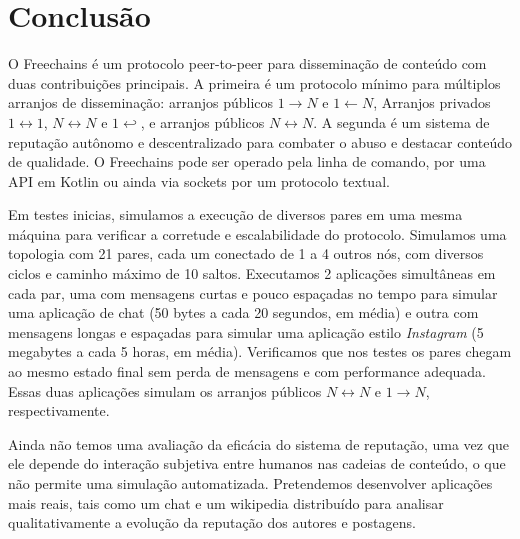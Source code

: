 \documentclass[12pt]{article}
\newcommand{\FC} {Freechains\xspace}
\newcommand{\Xon} {$1{\rightarrow}N$\xspace}
\newcommand{\Xno} {$1{\leftarrow}N$\xspace}
\newcommand{\Xnn} {$N{\leftrightarrow}N$\xspace}
\newcommand{\Xoo} {$1{\leftrightarrow}1$\xspace}
\newcommand{\Xo}  {$1{\hookleftarrow}$\xspace}
\begin{document}
\section{Conclusão}
\label{sec.conclusion}

O \FC é um protocolo peer-to-peer para disseminação de conteúdo com duas
contribuições principais.
A primeira é um protocolo mínimo para múltiplos arranjos de disseminação:
arranjos públicos \Xon e \Xno, Arranjos privados \Xoo, \Xnn e \Xo, e arranjos
públicos \Xnn.
A segunda é um sistema de reputação autônomo e descentralizado para combater
o abuso e destacar conteúdo de qualidade.
O \FC pode ser operado pela linha de comando, por uma API em Kotlin ou ainda
via sockets por um protocolo textual.

Em testes inicias, simulamos a execução de diversos pares em uma mesma máquina
para verificar a corretude e escalabilidade do protocolo.
Simulamos uma topologia com 21 pares, cada um conectado de 1 a 4 outros nós,
com diversos ciclos e caminho máximo de 10 saltos.
Executamos 2 aplicações simultâneas em cada par, uma com mensagens curtas e
pouco espaçadas no tempo para simular uma aplicação de chat (50 bytes a cada 20
segundos, em média) e outra com mensagens longas e espaçadas para simular uma
aplicação estilo \emph{Instagram} (5 megabytes a cada 5 horas, em média).
Verificamos que nos testes os pares chegam ao mesmo estado final sem perda de
mensagens e com performance adequada.
Essas duas aplicações simulam os arranjos públicos \Xnn e \Xon,
respectivamente.

Ainda não temos uma avaliação da eficácia do sistema de reputação, uma vez que
ele depende do interação subjetiva entre humanos nas cadeias de conteúdo, o que
não permite uma simulação automatizada.
Pretendemos desenvolver aplicações mais reais, tais como um chat e um wikipedia
distribuído para analisar qualitativamente a evolução da reputação dos autores
e postagens.



\end{document}
